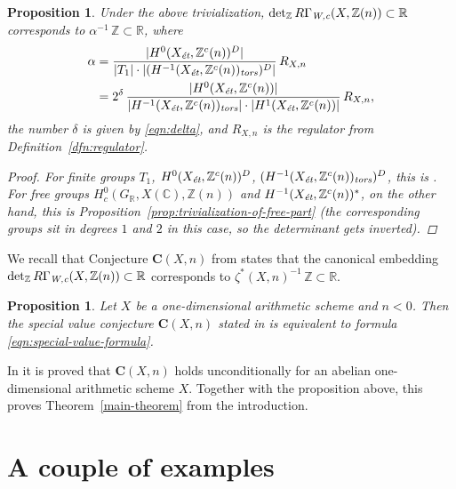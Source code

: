 \documentclass[draft]{article}
\newcommand{\CC}{\mathbb{C}}
\newcommand{\RR}{\mathbb{R}}
\newcommand{\ZZ}{\mathbb{Z}}
\renewcommand{\det}{\operatorname{det}}
\newcommand{\et}{\text{\it \'{e}t}}
\newcommand{\tors}{\text{\it tors}}
\newcommand{\Wc}{\text{\it W,c}}
\theoremstyle{myplain}
\newtheorem{proposition}[theorem]{Proposition}
\theoremstyle{mydefinition}
\begin{document}
\begin{proposition}
  Under the above trivialization, $\det_\ZZ R\Gamma_\Wc (X, \ZZ(n)) \subset \RR$
  corresponds to $\alpha^{-1}\,\ZZ \subset \RR$, where
  \begin{align*}
    \alpha & = \frac{|H^0 (X_\et, \ZZ^c(n))^D|}{|T_1| \cdot |(H^{-1} (X_\et, \ZZ^c(n))_\tors)^D|}\,R_{X,n} \\
           & = 2^\delta\,\frac{|H^0 (X_\et, \ZZ^c (n))|}{|H^{-1} (X_\et, \ZZ^c(n))_\tors|\cdot |H^1 (X_\et, \ZZ^c(n))|}\,R_{X,n},
  \end{align*}
  the number $\delta$ is given by \eqref{eqn:delta}, and $R_{X,n}$ is
  the regulator from Definition~\ref{dfn:regulator}.

  \begin{proof}
    For finite groups $T_1$, $H^0 (X_\et, \ZZ^c(n))^D$,
    $(H^{-1} (X_\et, \ZZ^c(n))_\tors)^D$, this is
    \cite[Lemma~A.5]{Beshenov-Weil-etale-2}. For free groups
    $H^0_c (G_\RR, X(\CC), \ZZ(n))$ and $H^{-1} (X_\et, \ZZ^c (n))^*$, on the
    other hand, this is Proposition~\ref{prop:trivialization-of-free-part}
    (the corresponding groups sit in degrees $1$ and $2$ in this case, so the
    determinant gets inverted).
  \end{proof}
\end{proposition}

We recall that Conjecture $\mathbf{C} (X,n)$ from
\cite[\S 4]{Beshenov-Weil-etale-2} states that the canonical embedding
$\det_\ZZ R\Gamma_\Wc (X, \ZZ(n)) \subset \RR$ corresponds to
$\zeta^* (X,n)^{-1}\,\ZZ \subset \RR$.

\begin{proposition}
  Let $X$ be a one-dimensional arithmetic scheme and ${n < 0}$. Then the special
  value conjecture $\mathbf{C} (X,n)$ stated in \cite{Beshenov-Weil-etale-2} is
  equivalent to formula \eqref{eqn:special-value-formula}.
\end{proposition}

In \cite[\S 7]{Beshenov-Weil-etale-2} it is proved that $\mathbf{C} (X,n)$ holds
unconditionally for an abelian one-dimensional arithmetic scheme $X$. Together
with the proposition above, this proves Theorem~\ref{main-theorem} from the
introduction.


\section{A couple of examples}
\label{sec:examples}
\end{document}
